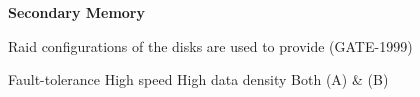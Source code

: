 
\centerline{\textbf{ \LARGE Secondary Memory}}

\begin{questyle}
  \question  Raid configurations of the disks are used to provide  (GATE-1999)

  \begin{choices}
    \CorrectChoice  Fault-tolerance
    \choice         High speed
    \choice         High data density
    \choice         Both (A) & (B)
  \end{choices}
\end{questyle}
